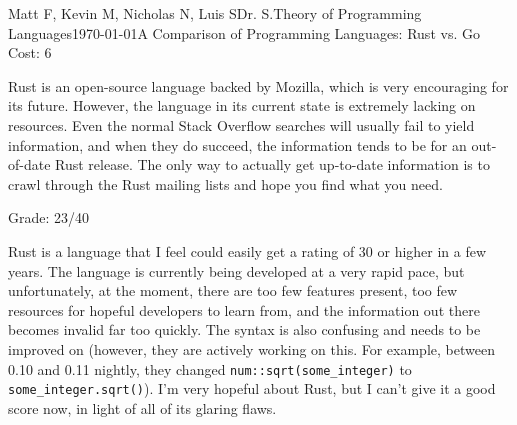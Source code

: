 \documentclass[12pt,letterpaper]{article}
\begin{document}
\begin{mla}{Matt F, Kevin M, Nicholas N, Luis S}{}{Dr. S.}{Theory of Programming Languages}{\today}{A Comparison of Programming Languages: Rust vs. Go}
Cost: 6

Rust is an open-source language backed by Mozilla, which is very encouraging for its future. However, the language in its current state is extremely lacking on resources. Even the normal Stack Overflow searches will usually fail to yield information, and when they do succeed, the information tends to be for an out-of-date Rust release. The only way to actually get up-to-date information is to crawl through the Rust mailing lists and hope you find what you need.

Grade: 23/40

Rust is a language that I feel could easily get a rating of 30 or higher in a few years. The language is currently being developed at a very rapid pace, but unfortunately, at the moment, there are too few features present, too few resources for hopeful developers to learn from, and the information out there becomes invalid far too quickly. The syntax is also confusing and needs to be improved on (however, they are actively working on this. For example, between 0.10 and 0.11 nightly, they changed \texttt{num::sqrt(some\_integer)} to \texttt{some\_integer.sqrt()}). I'm very hopeful about Rust, but I can't give it a good score now, in light of all of its glaring flaws.

\end{mla}
\end{document}
